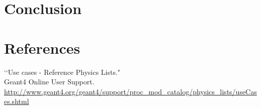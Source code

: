 \documentclass[11pt]{article}
\begin{document}
\begin{multicols}{2}
\section{Conclusion}

\section{References}
\begin{thebibliography}{99}

\lq\lq Use cases - Reference Physics Lists." \\
Geant4 Online User Support. \\
\url{http://www.geant4.org/geant4/support/proc_mod_catalog/physics_lists/useCases.shtml}
 
\end{thebibliography}

\end{multicols}
\end{document}
